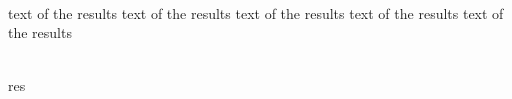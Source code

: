 \lipsum[1]\\

\begin{res}
    text of the results text of the results  text of the results text of the results text of the results 
\end{res}

\cite{xu_system-level_2021} \\

\gls{res}
